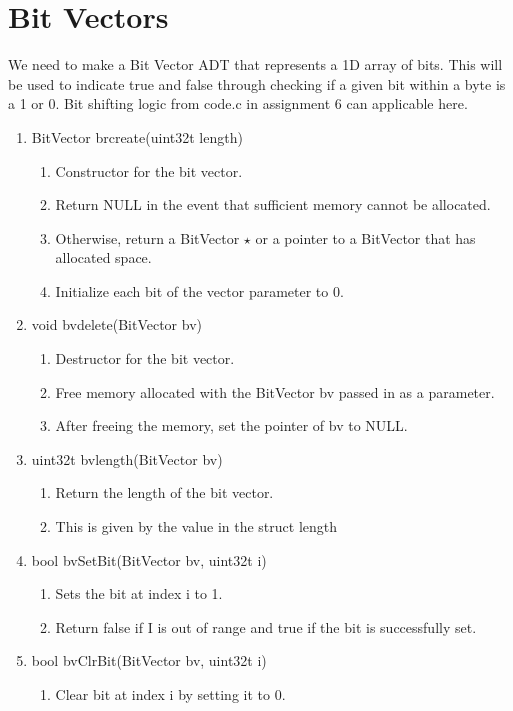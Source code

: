 \documentclass[11pt]{article}
\begin{document}
\section{Bit Vectors}\label{ss:bitvector}
We need to make a Bit Vector ADT that represents a 1D array of bits. This will be used to indicate true and false through checking if a given bit within a byte is a 1 or 0. Bit shifting logic from code.c in assignment 6 can applicable here.
\begin{enumerate}
\item BitVector brcreate(uint32t length)
	\begin{enumerate}
	\item Constructor for the bit vector.
	\item Return NULL in the event that sufficient memory cannot be allocated.
	\item Otherwise, return a BitVector $\star$ or a pointer to a BitVector that has allocated space.
	\item Initialize each bit of the vector parameter to 0.
	\end{enumerate}
\item void bvdelete(BitVector bv)
	\begin{enumerate}
	\item Destructor for the bit vector.
	\item Free memory allocated with the BitVector bv passed in as a parameter.
	\item After freeing the memory, set the pointer of bv to NULL.
	\end{enumerate}
\item uint32t bvlength(BitVector bv)
	\begin{enumerate}
	\item Return the length of the bit vector.
	\item This is given by the value in the struct length
	\end{enumerate}
\item bool bvSetBit(BitVector bv, uint32t i)
	\begin{enumerate}
	\item Sets the bit at index i to 1.
	\item Return false if I is out of range and true if the bit is successfully set.
	\end{enumerate}
\item bool bvClrBit(BitVector bv, uint32t i)
	\begin{enumerate}
	\item Clear bit at index i by setting it to 0.

\end{enumerate}
\end{enumerate}
\end{document}
